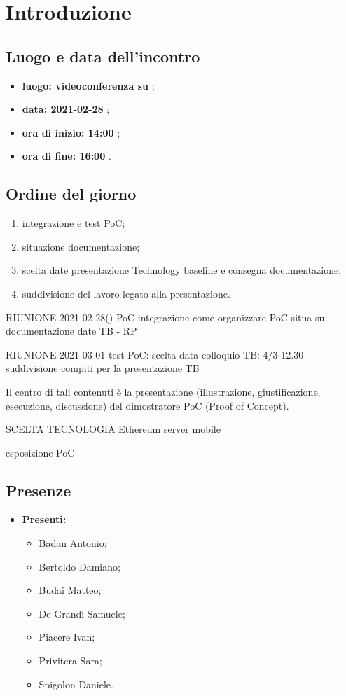 \section*{Introduzione}
\subsection*{Luogo e data dell'incontro}
\begin{itemize}
	\item \textbf{luogo: videoconferenza su } ;
	\item \textbf{data: 2021-02-28} ;
	\item \textbf{ora di inizio: 14:00} ;
	\item \textbf{ora di fine: 16:00} .
\end{itemize}

\subsection*{Ordine del giorno}
\begin{enumerate}
	\item integrazione e test PoC;
	\item situazione documentazione;
	\item scelta date presentazione Technology baseline e consegna documentazione;
	\item suddivisione del lavoro legato alla presentazione.
\end{enumerate}
RIUNIONE 2021-02-28()
PoC integrazione
come organizzare PoC
situa su documentazione
date TB - RP

RIUNIONE 2021-03-01
test PoC:
scelta data colloquio TB: 4/3 12.30
suddivisione compiti per la presentazione TB

Il centro di tali contenuti è la presentazione (illustrazione, giustificazione, esecuzione, discussione) del dimostratore PoC (Proof of Concept).

SCELTA TECNOLOGIA
Ethereum
server
mobile

esposizione PoC

\subsection*{Presenze}
\begin{itemize}
	\item \textbf{Presenti:}
	\begin{itemize}
		\item Badan Antonio;
		\item Bertoldo Damiano;
		\item Budai Matteo;
		\item De Grandi Samuele;
		\item Piacere Ivan;
		\item Privitera Sara;
		\item Spigolon Daniele.
	\end{itemize}
\end{itemize}

